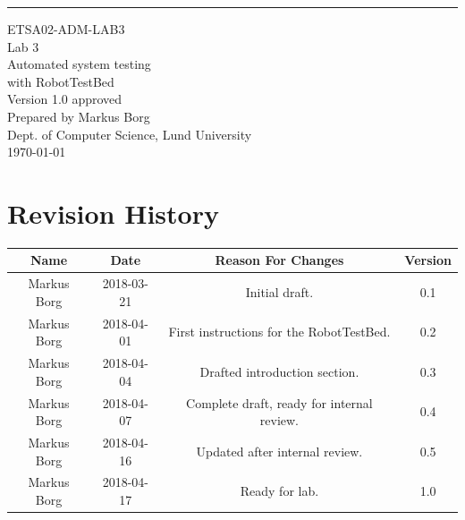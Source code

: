 \documentclass{scrreprt}
\date{}
\def\myversion{1.0 }
\begin{document}
\begin{flushright}
    \rule{16cm}{5pt}\vskip1cm
    \begin{bfseries}
    	\LARGE{ETSA02-ADM-LAB3}\\
    	\vspace{1.5cm}
        \Huge{Lab 3}\\
        \vspace{0.5cm}
        Automated system testing\\
        \vspace{0.5cm}
        with RobotTestBed\\
        \vspace{1.5cm}
        \LARGE{Version \myversion approved}\\
        \vspace{1.5cm}
        Prepared by Markus Borg\\
        Dept. of Computer Science, Lund University\\
        \vspace{1.5cm}
        \today\\
    \end{bfseries}
\end{flushright}


\chapter*{Revision History}

\begin{center}
    \begin{tabular}{|c|c|c|c|}
        \hline
	    Name & Date & Reason For Changes & Version\\
        \hline
	    Markus Borg & 2018-03-21 & Initial draft. & 0.1\\
        \hline
        Markus Borg & 2018-04-01 & First instructions for the RobotTestBed. & 0.2\\
        \hline
        Markus Borg & 2018-04-04 & Drafted introduction section. & 0.3\\
        \hline
        Markus Borg & 2018-04-07 & Complete draft, ready for internal review. & 0.4\\
        \hline
        Markus Borg & 2018-04-16 & Updated after internal review. & 0.5\\
        \hline
        Markus Borg & 2018-04-17 & Ready for lab. & 1.0\\
        \hline
    \end{tabular}
\end{center}
\end{document}
